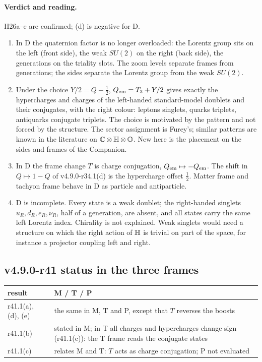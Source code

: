 \paragraph{Verdict and reading.}
H26a--e are confirmed; (d) is negative for D.
\begin{enumerate}[leftmargin=2em]
\item In D the quaternion factor is no longer overloaded: the Lorentz group sits on the left (front side), the weak \(SU(2)\) on the
right (back side), the generations on the triality slots.  The zoom levels separate frames from generations; the sides separate the
Lorentz group from the weak \(SU(2)\).
\item Under the choice \(Y/2=Q-\tfrac12\), \(Q_{\rm em}=T_3+Y/2\) gives exactly the hypercharges and charges of the left-handed
standard-model doublets and their conjugates, with the right colour: leptons singlets, quarks triplets, antiquarks conjugate
triplets.  The choice is motivated by the pattern and not forced by the structure.  The sector assignment is Furey's; similar patterns
are known in the literature on \(\mathbb C\otimes\mathbb{H}\otimes\mathbb{O}\).  New here is the placement on the sides and frames of the Companion.
\item In D the frame change \(T\) is charge conjugation, \(Q_{\rm em}\mapsto-Q_{\rm em}\).  The shift in \(Q\mapsto1-Q\) of v4.9.0-r34.1(d) is
the hypercharge offset \(\tfrac12\).  Matter frame and tachyon frame behave in D as particle and antiparticle.
\item D is incomplete.  Every state is a weak doublet; the right-handed singlets \(u_R,d_R,e_R,\nu_R\), half of a generation, are absent,
and all states carry the same left Lorentz index.  Chirality is not explained.  Weak singlets would need a structure on which the right
action of \(\mathbb{H}\) is trivial on part of the space, for instance a projector coupling left and right.
\end{enumerate}

\subsection*{v4.9.0-r41 status in the three frames}
\label{subsec:v490-r41-frames}

\begin{center}
\small
\begin{tabular}{@{}>{\raggedright\arraybackslash}p{}>{\raggedright\arraybackslash}p{}@{}}
\toprule
result & M / T / P\\
\midrule
r41.1(a), (d), (e) & the same in M, T and P, except that \(T\) reverses the boosts\\
r41.1(b) & stated in M; in T all charges and hypercharges change sign (r41.1(c)): the T frame reads the conjugate states\\
r41.1(c) & relates M and T: \(T\) acts as charge conjugation; P not evaluated\\
\bottomrule
\end{tabular}
\end{center}

